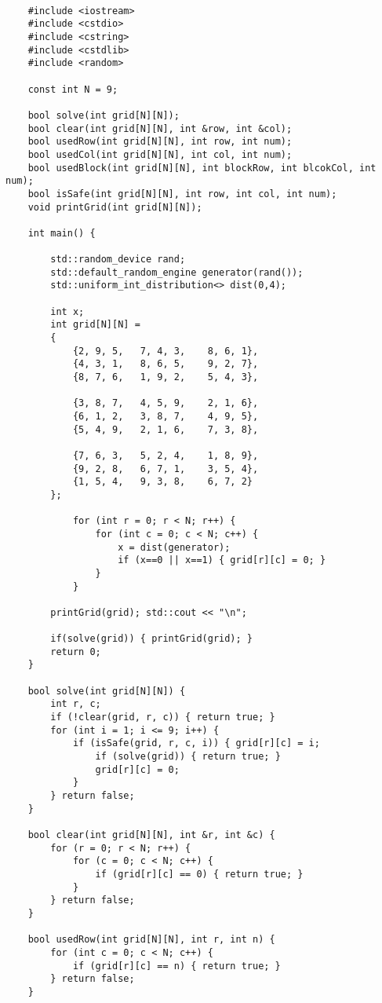 \documentclass[11pt]{amsart}
\begin{document}
\begin{verbatim}

	#include <iostream>
	#include <cstdio>
	#include <cstring>
	#include <cstdlib>
	#include <random>

	const int N = 9;

	bool solve(int grid[N][N]);
	bool clear(int grid[N][N], int &row, int &col);
	bool usedRow(int grid[N][N], int row, int num);
	bool usedCol(int grid[N][N], int col, int num);
	bool usedBlock(int grid[N][N], int blockRow, int blcokCol, int num);
	bool isSafe(int grid[N][N], int row, int col, int num);
	void printGrid(int grid[N][N]);

	int main() {

	    std::random_device rand;
	    std::default_random_engine generator(rand());
	    std::uniform_int_distribution<> dist(0,4);

	    int x;
	    int grid[N][N] =
	    {
	        {2, 9, 5,   7, 4, 3,    8, 6, 1},
	        {4, 3, 1,   8, 6, 5,    9, 2, 7},
	        {8, 7, 6,   1, 9, 2,    5, 4, 3},

	        {3, 8, 7,   4, 5, 9,    2, 1, 6},
	        {6, 1, 2,   3, 8, 7,    4, 9, 5},
	        {5, 4, 9,   2, 1, 6,    7, 3, 8},

	        {7, 6, 3,   5, 2, 4,    1, 8, 9},
	        {9, 2, 8,   6, 7, 1,    3, 5, 4},
	        {1, 5, 4,   9, 3, 8,    6, 7, 2}
	    };

	        for (int r = 0; r < N; r++) {
	            for (int c = 0; c < N; c++) {
	                x = dist(generator);
	                if (x==0 || x==1) { grid[r][c] = 0; }
	            }
	        }

	    printGrid(grid); std::cout << "\n";

	    if(solve(grid)) { printGrid(grid); }
	    return 0;
	}

	bool solve(int grid[N][N]) {
	    int r, c;
	    if (!clear(grid, r, c)) { return true; }
	    for (int i = 1; i <= 9; i++) {
	        if (isSafe(grid, r, c, i)) { grid[r][c] = i;
	            if (solve(grid)) { return true; }
	            grid[r][c] = 0;
	        }
	    } return false;
	}

	bool clear(int grid[N][N], int &r, int &c) {
	    for (r = 0; r < N; r++) {
	        for (c = 0; c < N; c++) {
	            if (grid[r][c] == 0) { return true; }
	        }
	    } return false;
	}

	bool usedRow(int grid[N][N], int r, int n) {
	    for (int c = 0; c < N; c++) {
	        if (grid[r][c] == n) { return true; }
	    } return false;
	}


\end{verbatim}
\end{document}
